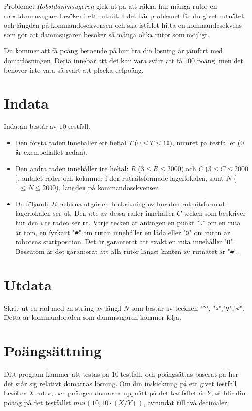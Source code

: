 
Problemet \textit{Robotdammsugaren} gick ut på att räkna hur många rutor en robotdammsugare
besöker i ett rutnät. I det här problemet får du givet rutnätet och längden på kommandosekvensen
och ska istället hitta en kommandosekvens som gör att dammsugaren besöker så många olika rutor som möjligt.

Du kommer att få poäng beroende på hur bra din lösning är jämfört med domarlösningen. Detta innebär att det kan vara
svårt att få $100$ poäng, men det behöver inte vara så svårt att plocka delpoäng.

\section*{Indata}
Indatan består av $10$ testfall.

\begin{itemize}
  \item 
    Den första raden innehåller ett heltal $T$ ($0 \leq T \leq 10$), numret på testfallet ($0$ är exempelfallet nedan).
  \item
    Den andra raden innehåller tre heltal: $R$ ($3 \le R \le 2000$) och $C$ ($3 \le C \le 2000$),
    antalet rader och kolumner i den rutnätsformade lagerlokalen, samt $N$ ($1 \le N \le 2000$), längden på kommandosekvensen.
  \item
    De följande $R$ raderna utgör en beskrivning av hur den rutnätsformade lagerlokalen ser ut.
    Den $i$:te av dessa rader innehåller $C$ tecken som beskriver hur den $i$:te raden ser ut.
    Varje tecken är antingen en punkt "\verb|.|" om en ruta är tom, en fyrkant "\verb|#|" om rutan innehåller en låda eller "\verb|O|" om rutan är robotens startposition. Det är garanterat att exakt en ruta innehåller "\verb|O|". Dessutom är det garanterat att alla rutor längst kanten av rutnätet är "\verb|#|".
\end{itemize}

\section*{Utdata}
Skriv ut en rad med en sträng av längd $N$ som består av tecknen "\verb|^|", "\verb|>|","\verb|v|","\verb|<|".
Detta är kommandoraden som dammsugaren kommer följa.


\section*{Poängsättning}
Ditt program kommer att testas på $10$ testfall, och poängsättas baserat på hur det står sig relativt domarnas lösning.
Om din inskickning på ett givet testfall besöker $X$ rutor, och poängen domarna uppnått på det testfallet är $Y$,
så blir din poäng på det testfallet $min(10, 10 \cdot (X / Y))$, avrundat till två decimaler.

